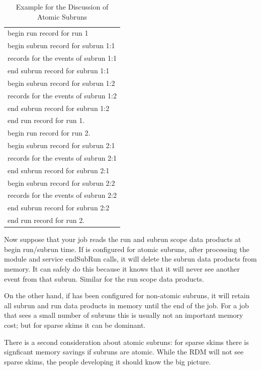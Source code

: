 \begin{table}
\begin{center}
\caption[Example For Discussion of Atomic Subruns]{Example for the Discussion of Atomic Subruns}
\label{tab:atomicsubruns}
\begin{tabular}{l}\hline
  begin run record for run 1 \\
  begin subrun record for subrun 1:1 \\
  records for the events of subrun 1:1 \\
  end subrun record for subrun 1:1 \\
   begin subrun record for subrun 1:2 \\
   records for the events of subrun 1:2 \\
   end subrun record for subrun 1:2 \\
   end run record for run 1. \\ \hline
   begin run record for run 2. \\
   begin subrun record for subrun 2:1 \\
   records for the events of subrun 2:1 \\
   end subrun record for subrun 2:1 \\
   begin subrun record for subrun 2:2 \\
   records for the events of subrun 2:2 \\
   end subrun record for subrun 2:2 \\
   end run record for run 2. \\
   \hline
  \end{tabular}
\end{center}
\end{table}

Now suppose that your job reads the run and subrun scope data products at begin run/subrun time.
If \art is configured for atomic subruns, after processing the module and service
{\code endSubRun} calls, it will delete the subrun data products from memory. It can safely do this
because it knows that it will never see another event from that subrun.
Similar for the run scope data products.

On the other hand, if \art has been configured for non-atomic subruns, it will retain all subrun
and run data products in memory until the end of the job.
For a job that sees a small number of subruns this is usually not an important memory cost; but
for sparse skims it can be dominant.


There is a second consideration about atomic subruns:
for sparse skims there is signficant memory savings if subruns are atomic.
While the RDM will not see sparse skims, the people developing it should know the big picture.



